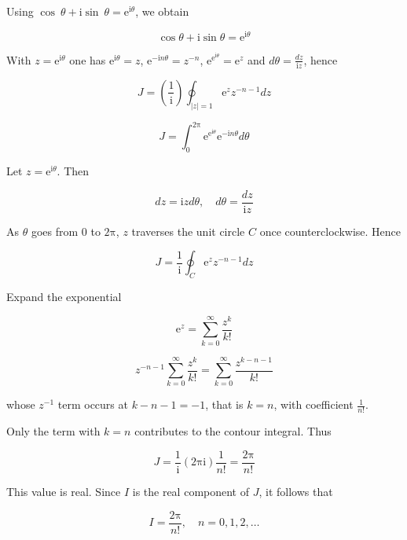 \documentclass[11pt,a4paper]{article}
\theoremstyle{definition}
\theoremstyle{plain}
\begin{document}
Using $\cos \ \theta + \mathrm{i}\sin \ \theta = \mathrm{e}^{\mathrm{i}\theta}$, we obtain

\begin{equation}
\cos \theta + \mathrm{i}\sin \theta = \mathrm{e}^{\mathrm{i}\theta}
\end{equation}

With $z = \mathrm{e}^{\mathrm{i}\theta}$ one has $\mathrm{e}^{\mathrm{i}\theta} = z$, $\mathrm{e}^{-\mathrm{i}n\theta} = z^{-n}$, $\mathrm{e}^{\mathrm{e}^{\mathrm{i}\theta}} = \mathrm{e}^{z}$ and $d\theta = \frac{dz}{\mathrm{i}z}$, hence



\[
J = \left(\frac{1}{\mathrm{i}}\right)\oint_{\vert{}z\vert{} = 1}\mathrm{e}^{z}z^{-n - 1}dz
\]

\[
J = \int_{0}^{2\mathrm{\pi}}\mathrm{e}^{\mathrm{e}^{\mathrm{i}\theta}}\mathrm{e}^{-\mathrm{i}n\theta} d\theta
\]

Let $z = \mathrm{e}^{\mathrm{i}\theta}$. Then

\begin{equation}
dz = \mathrm{i}z d\theta, \quad d\theta = \frac{dz}{\mathrm{i}z}
\end{equation}

As $\theta$ goes from 0 to $2\mathrm{\pi}$, $z$ traverses the unit circle $C$ once counterclockwise. Hence

\begin{equation}
J = \frac{1}{\mathrm{i}}\oint_{C}\mathrm{e}^{z}z^{-n - 1} dz
\end{equation}

Expand the exponential

\begin{equation}
\mathrm{e}^{z} = \sum_{k = 0}^{\infty}\frac{z^{k}}{k!}
\end{equation}

\[
z^{-n - 1}\sum_{k = 0}^{\infty}\frac{z^{k}}{k!} = \sum_{k = 0}^{\infty}\frac{z^{k - n - 1}}{k!}
\]



whose $z^{-1}$ term occurs at $k - n - 1 = -1$, that is $k = n$, with coefficient $\frac{1}{n!}$.

Only the term with $k = n$ contributes to the contour integral. Thus

\begin{equation}
J = \frac{1}{\mathrm{i}}(2\mathrm{\pi}\mathrm{i})\frac{1}{n!} = \frac{2\mathrm{\pi}}{n!}
\end{equation}

This value is real. Since $I$ is the real component of $J$, it follows that

\begin{equation}
I = \frac{2\mathrm{\pi}}{n!}, \quad n = 0, 1, 2, \dots
\end{equation}
\end{document}
